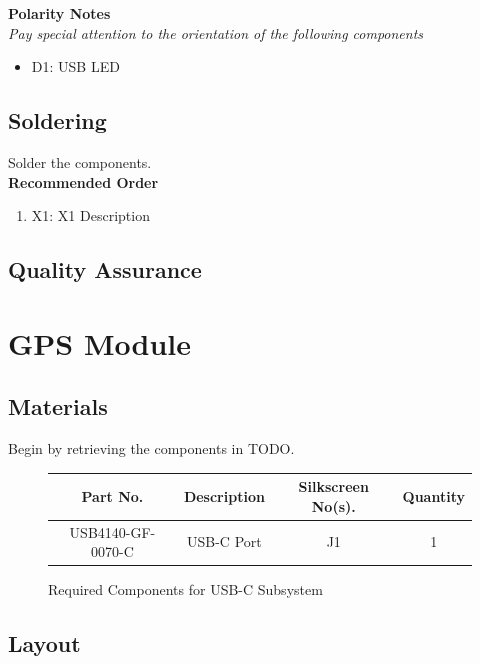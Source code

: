 \documentclass{article}
\begin{document}
\noindent \textbf{Polarity Notes}\\
\noindent \textit{Pay special attention to the orientation of the following components}
\begin{itemize}
  \item D1: USB LED
\end{itemize}

\subsection{Soldering}

Solder the components. \\

\noindent \textbf{Recommended Order}

\begin{enumerate}
  \item X1: X1 Description
\end{enumerate}
\subsection{Quality Assurance}

\section{GPS Module}

\subsection{Materials}
Begin by retrieving the components in TODO.

\begin{figure}[H]
    \begin{center}
        \begin{tabular}{ c|c|c|c } 
            \textbf{Part No.} & \textbf{Description} & \textbf{Silkscreen No(s).} & \textbf{Quantity} \\ 
            \hline
            USB4140-GF-0070-C & USB-C Port & J1 & 1 \\ 
        \end{tabular}
    \end{center}
    \caption{Required Components for USB-C Subsystem}
    \label{tbl:TODO-materials}
\end{figure}

\subsection{Layout}
\end{document}
